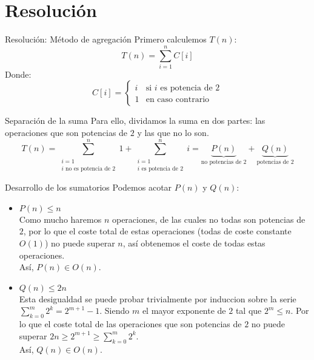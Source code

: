\documentclass[aspectratio=169]{beamer}
\begin{document}
\section{Resolución}

\begin{frame}{Resolución: Método de agregación}
    Primero calculemos $T(n)$:
    \[
    T(n) = \sum_{i=1}^{n} C[i]
    \]
    Donde:
    \[
    C[i] = 
    \begin{cases}
        i & \text{si } i \text{ es potencia de } 2 \\
        1 & \text{en caso contrario}
    \end{cases}
    \]
\end{frame}

\begin{frame}{Separación de la suma}
    Para ello, dividamos la suma en dos partes: las operaciones que son potencias de $2$ y las que no lo son.
    \[
    T(n) = \sum_{\substack{i=1 \\ i \text{ no es potencia de } 2}}^{n} 1 + \sum_{\substack{i=1 \\ i \text{ es potencia de } 2}}^{n} i = \underbrace{P(n)}_{\text{no potencias de } 2} + \underbrace{Q(n)}_{\text{potencias de } 2}
    \]
\end{frame}

\begin{frame}{Desarrollo de los sumatorios}
    Podemos acotar $P(n)$ y $Q(n)$:
    \begin{itemize}
        \item $P(n) \leq n$ \\
        Como mucho haremos $n$ operaciones, de las cuales no todas son potencias de $2$, por lo que el coste total de estas operaciones (todas de coste constante $O(1)$) no puede superar $n$, así obtenemos el coste de todas estas operaciones.\\
        Así, $P(n) \in O(n)$.
        \item $Q(n) \leq 2n$ \\
        Esta desigualdad se puede probar trivialmente por induccion sobre la serie $\sum_{k=0}^{m} 2^k = 2^{m+1} - 1$. Siendo $m$ el mayor exponente de $2$ tal que $2^m \leq n$. Por lo que el coste total de las operaciones que son potencias de $2$ no puede superar $2n \geq 2^{m+1} \geq \sum_{k=0}^{m} 2^k$.\\
        Así, $Q(n) \in O(n)$.
    \end{itemize}
\end{frame}
\end{document}
